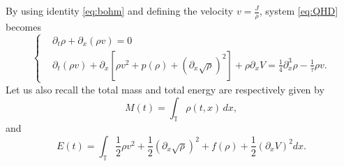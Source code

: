 \documentclass[leqno]{amsart}
\theoremstyle{plain}
\theoremstyle{definition}
\theoremstyle{remark}
\theoremstyle{plain}
\theoremstyle{plain}
\def\T{{\mathbb T}}%
\def\d{{\partial}}
\numberwithin{equation}{section}
\begin{document}
By using identity \eqref{eq:bohm} and defining the velocity $v=\frac{J}{\rho}$, system \eqref{eq:QHD} becomes
\begin{equation}\label{eq:QHD_1d}
\left\{\begin{aligned}
&\d_t\rho+\d_x(\rho v)=0\\
&\d_t(\rho v)+\d_x[\rho v^2+p(\rho)+(\d_x\sqrt{\rho})^2]+\rho\d_xV=\frac14\d_{x}^3\rho-\frac{1}{\tau}\rho v.
\end{aligned}\right.
\end{equation}
Let us also recall the total mass and total energy are respectively given by
\begin{equation*}
M(t)=\int_\T\rho(t, x)\,dx,
\end{equation*}
and
\begin{equation}\label{eq:en_1d}
E(t)=\int_{\T}\frac12\rho v^2+\frac12(\d_x\sqrt{\rho})^2+f(\rho)+\frac12(\d_xV)^2dx.
\end{equation}
\end{document}
